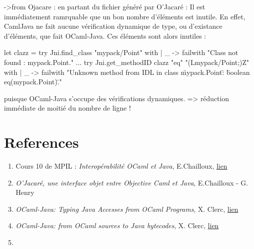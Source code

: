 \documentclass[a4paper, 11pt]{report}
\begin{document}
->from Ojacare : en partant du fichier généré par O'Jacaré :
Il est immédiatement ramrquable que un bon nombre d'éléments est
inutile.
En effet, CamlJava ne fait aucune vérification dynamique de type, ou
d'existance d'éléments, que fait OCaml-Java. Ces éléments sont alors
inutiles :
\begin{OCaml}
let clazz =
    try Jni.find_class "mypack/Point"
    with | _ -> failwith "Class not found : mypack.Point."
...
try Jni.get_methodID clazz "eq" "(Lmypack/Point;)Z"
      with
      | _ ->
          failwith
            "Unknown method from IDL in class \"mypack.Point\" :
          \"boolean eq(mypack.Point)\"."
\end{OCaml}
puisque OCaml-Java s'occupe des vérifications dynamiques.
=> réduction immédiate de moitié du nombre de ligne !







\newpage

\section*{References}
\begin{enumerate}
\item Cours 10 de MPIL : \emph{Interopérabilité OCaml et Java}, E.Chailloux,
\href{https://www-licence.ufr-info-p6.jussieu.fr/lmd/licence/2013/ue/LI332-2013oct/public/cours/COURS10.pdf}{lien}
\item \emph{O'Jacaré, une interface objet entre Objective Caml et Java}, E.Chailloux - G. Henry
\item\emph{OCaml-Java: Typing Java Accesses from OCaml Programs}, X. Clerc,
\href{http://www.cs.ru.nl/P.Achten/IFL2013/symposium_proceedings_IFL2013/ifl2013_submission_17.pdf}{lien}
\item \emph{OCaml-Java: from OCaml sources to Java bytecodes}, X. Clerc,
\href{http://www.lexifi.com/ml2012/full9.pd}{lien}
\item
\end{enumerate}
\end{document}
